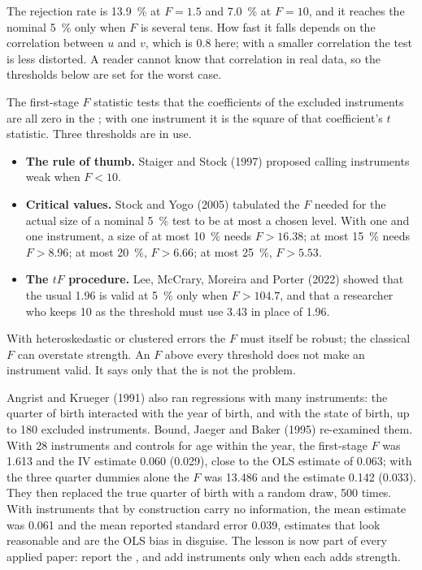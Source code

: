 The rejection rate is 13.9~\% at $F = 1.5$ and 7.0~\% at $F = 10$, and it
reaches the nominal 5~\% only when $F$ is several tens.
How fast it falls depends on the correlation between $u$ and $v$, which is
0.8 here; with a smaller correlation the test is less distorted. A reader
cannot know that correlation in real data, so the thresholds below are set for
the worst case.

\begin{measure}
The first-stage $F$ statistic tests that the coefficients of the excluded
instruments are all zero in the ; with one instrument it is the
square of that coefficient's $t$ statistic. Three thresholds are in use.
\begin{itemize}
\item \textbf{The rule of thumb.} Staiger and Stock (1997) proposed calling
instruments weak when $F < 10$. %
\item \textbf{Critical values.} Stock and Yogo (2005) tabulated the $F$ needed
for the actual size of a nominal 5~\% test to be at most a chosen level. With
one  and one instrument, a size of at most 10~\% needs
$F > 16.38$; at most 15~\% needs $F > 8.96$; at most 20~\%, $F > 6.66$; at most 25~\%, $F > 5.53$. %
\item \textbf{The $tF$ procedure.} Lee, McCrary, Moreira and Porter (2022)
showed that the usual 1.96 is valid at 5~\% only when $F > 104.7$, and that a
researcher who keeps 10 as the threshold must use 3.43 in place of 1.96.
\end{itemize}
With heteroskedastic or clustered errors the $F$ must itself be robust; the
classical $F$ can overstate strength. An $F$ above every threshold does not
make an instrument valid. It says only that the  is not the
problem.
\end{measure}

\begin{record}
Angrist and Krueger (1991) also ran regressions with many instruments: the
quarter of birth interacted with the year of birth, and with the state of
birth, up to 180 excluded instruments. Bound, Jaeger and Baker (1995)
re-examined them. With 28 instruments and controls for age within the year,
the first-stage $F$ was 1.613 and the IV estimate 0.060 (0.029), close to the
OLS estimate of 0.063; with the three quarter dummies alone the $F$ was 13.486
and the estimate 0.142 (0.033). %
They then replaced the true quarter of birth with a random draw, 500 times.
With instruments that by construction carry no information, the mean estimate
was 0.061 and the mean reported standard error 0.039, estimates that look
reasonable and are the OLS bias in disguise. %
The lesson is now part of every applied paper: report the , and
add instruments only when each adds strength.
\end{record}

